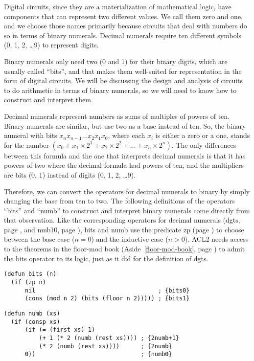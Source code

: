 Digital circuits, since they are a materialization of mathematical logic,
have components that can represent two different values.
We call them zero and one, and we choose those names primarily
because circuits that deal with numbers do so in terms of binary numerals.
Decimal numerals require ten different symbols (0, 1, 2, \dots 9)
to represent digits.

Binary numerals only need two (0 and 1) for their binary digits,
which are usually called ``bits'', and that makes them well-suited
for representation in the form of digital circuits.
We will be discussing the design and analysis of circuits to do
arithmetic in terms of binary numerals, so we will need to know
how to construct and interpret them.

Decimal numerals represent numbers as sums of multiples of powers of ten.
Binary numerals are similar, but use two as a base instead of ten.
So, the binary numeral with bits $x_nx_{n-1}\dots x_2x_1x_0$,
where each $x_i$ is either a zero or a one, stands for the number
$(x_0 + x_1 \times 2^1 + x_2 \times 2^2 + \dots + x_{n} \times 2^{n})$.
The only differences between this formula and the one that interprets
decimal numerals is that it has powers of two where the decimal formula had
powers of ten, and the multipliers are bits (0, 1) instead of
digits (0, 1, 2, \dots 9).

Therefore, we can convert the operators for decimal numerals to binary
by simply changing the base from ten to two.
The following definitions of the operators ``bits'' and ``numb''
to construct and interpret binary numerals come directly
from that observation.
Like the corresponding operators for decimal numerals
(dgts, page \pageref{dgts-defun}, and nmb10, page \pageref{nmb10-defun}),
bits and numb use the predicate zp (page \pageref{zp-def}) to choose
between the base case ($n = 0$) and the inductive case ($n > 0$).
ACL2 needs access to the theorems
in the floor-mod book (Aside~\ref{floor-mod-book}, page \pageref{floor-mod-book})
to admit the bits operator to its logic,
just as it did for the definition of dgts.

\label{bits-defun}
\begin{Verbatim}
(defun bits (n)
  (if (zp n)
      nil                                   ; {bits0}
      (cons (mod n 2) (bits (floor n 2))))) ; {bits1}
\end{Verbatim}
\label{nmb-defun}
\begin{Verbatim}
(defun numb (xs)
  (if (consp xs)
      (if (= (first xs) 1)
          (+ 1 (* 2 (numb (rest xs)))) ; {2numb+1}
          (* 2 (numb (rest xs))))      ; {2numb}
      0))                              ; {numb0}
\end{Verbatim}


